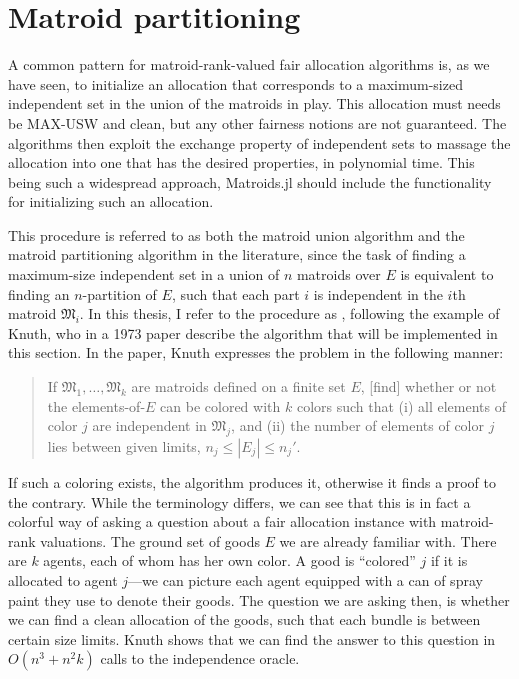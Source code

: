 \chapter{Matroid partitioning}
\label{sec:matroid-union-impl}
A common pattern for matroid-rank-valued fair allocation algorithms is, as we have seen, to initialize an allocation that corresponds to a maximum-sized independent set in the union of the matroids in play. This allocation must needs be MAX-USW and clean, but any other fairness notions are not guaranteed. The algorithms then exploit the exchange property of independent sets to massage the allocation into one that has the desired properties, in polynomial time. This being such a widespread approach, Matroids.jl should include the functionality for initializing such an allocation. 

This procedure is referred to as both the matroid union algorithm and the matroid partitioning algorithm in the literature, since the task of finding a maximum-size independent set in a union of $n$ matroids over $E$ is equivalent to finding an $n$-partition of $E$, such that each part $i$ is independent in the $i$th matroid $\mathfrak{M}_i$. In this thesis, I refer to the procedure as , following the example of Knuth, who in a 1973 paper describe the algorithm that will be implemented in this section. In the paper, Knuth expresses the problem in the following manner: 
\begin{quote}
  If $\mathfrak{M}_1,\dots,\mathfrak{M}_k$ are matroids defined on a finite set $E$, [find] whether or not the elements-of-$E$ can be colored with $k$ colors such that (i) all elements of color $j$ are independent in $\mathfrak{M}_j$, and (ii) the number of elements of color $j$ lies between given limits, $n_j\leq |E_j| \leq n_j'$.~\cite{knuth1973matroidpartitioning}
\end{quote}
If such a coloring exists, the algorithm produces it, otherwise it finds a proof to the contrary. While the terminology differs, we can see that this is in fact a colorful way of asking a question about a fair allocation instance with matroid-rank valuations. The ground set of goods $E$ we are already familiar with. There are $k$ agents, each of whom has her own color. A good is ``colored'' $j$ if it is allocated to agent $j$---we can picture each agent equipped with a can of spray paint they use to denote their goods. The question we are asking then, is whether we can find a clean allocation of the goods, such that each bundle is between certain size limits. Knuth shows that we can find the answer to this question in $O(n^3 + n^2k)$ calls to the independence oracle.

